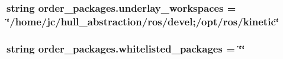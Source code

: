 \subsubsection[{\texorpdfstring{underlay\+\_\+workspaces}{underlay_workspaces}}]{\setlength{\rightskip}{0pt plus 5cm}string order\+\_\+packages.\+underlay\+\_\+workspaces = \char`\"{}/home/jc/hull\+\_\+abstraction/ros/devel;/opt/ros/kinetic\char`\"{}}\hypertarget{namespaceorder__packages_a11d102ff09fd2977b9075c4c722015d2}{}\label{namespaceorder__packages_a11d102ff09fd2977b9075c4c722015d2}
\subsubsection[{\texorpdfstring{whitelisted\+\_\+packages}{whitelisted_packages}}]{\setlength{\rightskip}{0pt plus 5cm}string order\+\_\+packages.\+whitelisted\+\_\+packages = \char`\"{}\char`\"{}}\hypertarget{namespaceorder__packages_a84450a73e77dbf3689293b97dcb697a4}{}\label{namespaceorder__packages_a84450a73e77dbf3689293b97dcb697a4}
